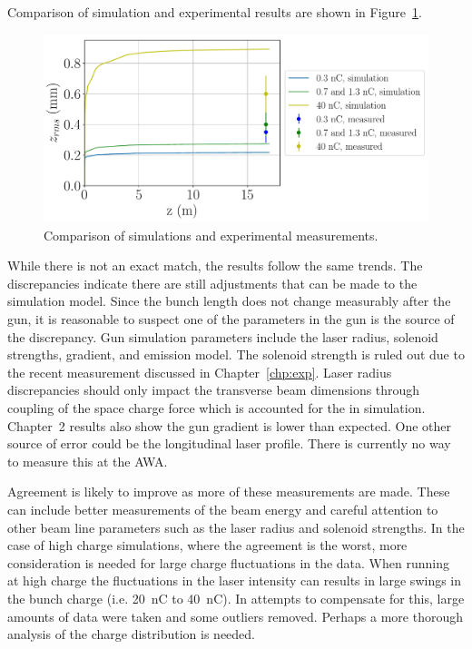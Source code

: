 Comparison of simulation and experimental results are shown in Figure~\ref{sims}.
\begin{figure}%
	\centering
	\includegraphics[width=0.75\linewidth]{images/THPMF048f5}
	\caption{Comparison of simulations and experimental measurements.}
	\label{sims}
\end{figure}
While there is not an exact match, the results follow the same trends.
The discrepancies indicate there are still adjustments that can be made
to the simulation model. Since the bunch length does not change measurably 
after the gun, it is reasonable to suspect one of the parameters in the 
gun is the source of the discrepancy. Gun simulation parameters include the laser radius, 
solenoid strengths, gradient, and emission model. The solenoid strength is ruled 
out due to the recent measurement discussed in Chapter~\ref{chp:exp}. 
Laser radius discrepancies should only impact the transverse beam dimensions 
through coupling of the space charge force which is accounted for the in simulation. 
Chapter~2 results also show the gun gradient is lower than expected.
One other source of error could be the longitudinal laser profile.
There is currently no way to measure this at the AWA. 

Agreement is likely to improve as more of these measurements are made. 
These can include better measurements of the beam energy and careful attention to other 
beam line parameters such as the laser radius and solenoid strengths.
In the case of high charge simulations, where the agreement is the worst, 
more consideration is needed for large charge fluctuations in the data.
When running at high charge the fluctuations in the laser intensity can results in 
large swings in the bunch charge (i.e. \SI{20}{nC} to \SI{40}{nC}). 
In attempts to compensate for this, large amounts of data were taken and some 
outliers removed. Perhaps a more thorough analysis of the charge distribution is needed. 

